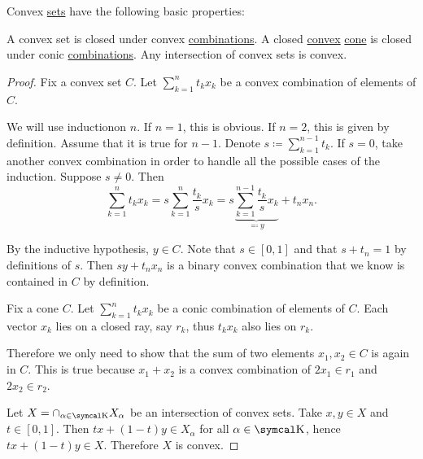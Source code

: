 \begin{proposition}\label{thm:convex_set_properties}
  Convex \hyperref[def:convex_set]{sets} have the following basic properties:

  \begin{PropEnum}
     A convex set is closed under convex \hyperref[def:linear_combination/convex]{combinations}.
     A closed \hyperref[def:convex_set]{convex} \hyperref[def:geometric_cone]{cone} is closed under conic \hyperref[def:linear_combination/conic]{combinations}.
     Any intersection of convex sets is convex.
  \end{PropEnum}
\end{proposition}
\begin{proof}
   Fix a convex set \( C \). Let \( \sum_{k=1}^n t_k x_k \) be a convex combination of elements of \( C \).

  We will use induction\IND on \( n \). If \( n = 1 \), this is obvious. If \( n = 2 \), this is given by definition. Assume that it is true for \( n - 1 \). Denote \( s \coloneqq \sum_{k=1}^{n-1} t_k \). If \( s = 0 \), take another convex combination in order to handle all the possible cases of the induction\IND. Suppose \( s \neq 0 \). Then
  \begin{equation*}
    \sum_{k=1}^n t_k x_k
    =
    s \sum_{k=1}^n \frac {t_k} s x_k
    =
    s \underbrace{\sum_{k=1}^{n-1} \frac {t_k} s x_k}_{\eqqcolon y} + t_n x_n.
  \end{equation*}

  By the inductive hypothesis, \( y \in C \). Note that \( s \in [0, 1] \) and that \( s + t_n = 1 \) by definitions of \( s \). Then \( s y + t_n x_n \) is a binary convex combination that we know is contained in \( C \) by definition.

   Fix a cone \( C \). Let \( \sum_{k=1}^n t_k x_k \) be a conic combination of elements of \( C \). Each vector \( x_k \) lies on a closed ray, say \( r_k \), thus \( t_k x_k \) also lies on \( r_k \).

  Therefore we only need to show that the sum of two elements \( x_1, x_2 \in C \) is again in \( C \). This is true because \( x_1 + x_2 \) is a convex combination of \( 2x_1 \in r_1 \) and \( 2x_2 \in r_2 \).

   Let \( X = \cap_{\alpha \in \CK} X_\alpha \) be an intersection of convex sets. Take \( x, y \in X \) and \( t \in [0, 1] \). Then \( tx + (1-t)y \in X_\alpha \) for all \( \alpha \in \CK \), hence \( tx + (1-t)y \in X \). Therefore \( X \) is convex.
\end{proof}

